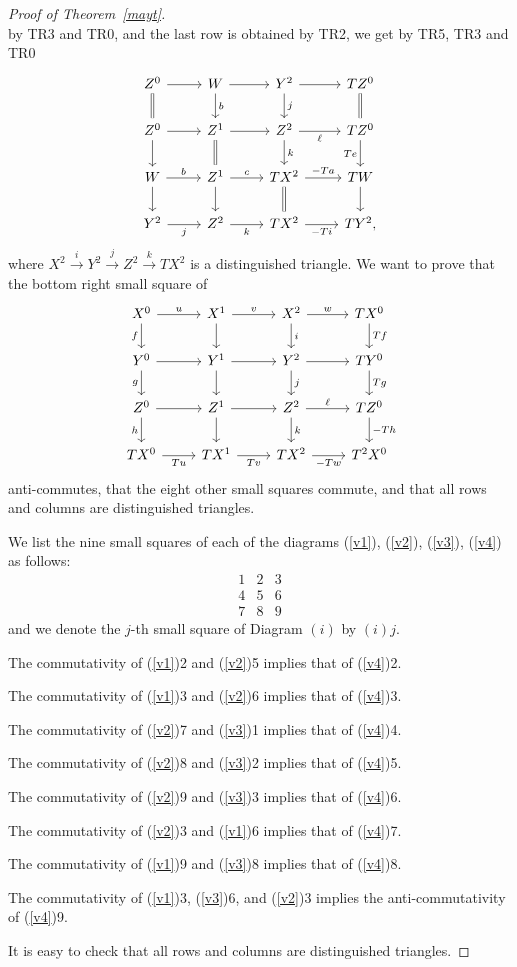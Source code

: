 \documentclass[12pt]{article}%
\theoremstyle{remark}
\theoremstyle{definition}
\begin{document}
\begin{proof}[Proof of Theorem~\ref{mayt}]
$$$$
by TR3 and TR0, and the last row is obtained by TR2, we get by TR5, TR3 and TR0
%
\begin{equation}\label{v3}
\begin{tikzcd}
Z^0\ar{r}\ar[equal]{d}&W\ar{d}{b}\ar{r}&Y^2\ar{d}{j}\ar{r}&TZ^0\ar[equal]{d}\\
Z^0\ar{d}\ar{r}&Z^1\ar{r}\ar[equal]{d}&Z^2\ar{d}{k}\ar{r}[swap]{\ell}&TZ^0\ar{d}[swap]{Te}\\
W\ar{d}\ar{r}{b}&Z^1\ar{d}\ar{r}{c}&TX^2\ar{r}{-Ta}\ar[equal]{d}&TW\ar{d}\\
Y^2\ar{r}[swap]{j}&Z^2\ar{r}[swap]{k}&TX^2\ar{r}[swap]{-Ti}&TY^2,
\end{tikzcd}
\end{equation}
%
where $X^2\overset{i}{\to}Y^2\overset{j}{\to}Z^2\overset{k}{\to}TX^2$ is a distinguished triangle. We want to prove that the bottom right small square of 
%
\begin{equation}\label{v4}
\begin{tikzcd}
X^0\ar{r}{u}\ar{d}[swap]{f}&X^1\ar{d}\ar{r}{v}&X^2\ar{d}{i}\ar{r}{w}&TX^0\ar{d}{Tf}\\ 
Y^0\ar{r}\ar{d}[swap]{g}&Y^1\ar{d}\ar{r}&Y^2\ar{d}{j}\ar{r}&TY^0\ar{d}{Tg}\\ 
Z^0\ar{r}\ar{d}[swap]{h}&Z^1\ar{d}\ar{r}&Z^2\ar{d}{k}\ar{r}{\ell}&TZ^0\ar{d}{-Th}\\ 
TX^0\ar{r}[swap]{Tu}&TX^1\ar{r}[swap]{Tv}&TX^2\ar{r}[swap]{-Tw}&T^2X^0
\end{tikzcd}
\end{equation}
%
anti-commutes, that the eight other small squares commute, and that all rows and columns are distinguished triangles.

We list the nine small squares of each of the diagrams (\ref{v1}), (\ref{v2}), (\ref{v3}), (\ref{v4}) as follows:
$$
\begin{matrix}1&2&3\\ 4&5&6\\ 7&8&9
\end{matrix}
$$ 
and we denote the $j$-th small square of Diagram $(i)$ by $(i)j$. 

The commutativity of (\ref{v1})2 and (\ref{v2})5 implies that of (\ref{v4})2. 

The commutativity of (\ref{v1})3 and (\ref{v2})6 implies that of (\ref{v4})3.

The commutativity of (\ref{v2})7 and (\ref{v3})1 implies that of (\ref{v4})4.

The commutativity of (\ref{v2})8 and (\ref{v3})2 implies that of (\ref{v4})5. 

The commutativity of (\ref{v2})9 and (\ref{v3})3 implies that of (\ref{v4})6. 

The commutativity of (\ref{v2})3 and (\ref{v1})6 implies that of (\ref{v4})7. 

The commutativity of (\ref{v1})9 and (\ref{v3})8 implies that of (\ref{v4})8. 

The commutativity of (\ref{v1})3, (\ref{v3})6, and (\ref{v2})3 implies the anti-commutativity of (\ref{v4})9. 

It is easy to check that all rows and columns are distinguished triangles.
\end{proof}
\end{document}
